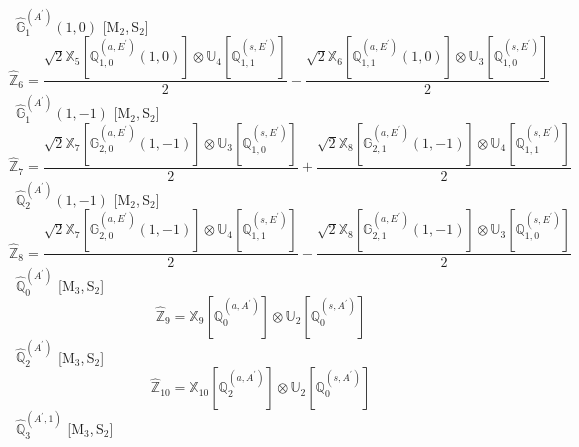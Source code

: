 \documentclass[fleqn,10pt,landscape]{article}
\begin{document}
\begin{itemize}
\begin{dmath*}
\end{dmath*}
\vspace{4mm}
\noindent {} $\,\,\,\hat{\mathbb{G}}_{1}^{(A^{\prime})}(1,0)$ [M$_{2}$,\,S$_{2}$]
\begin{dmath*}
\hat{\mathbb{Z}}_{6}=\frac{\sqrt{2} \mathbb{X}_{5}[\mathbb{Q}_{1,0}^{(a,E^{\prime})}(1,0)] \otimes\mathbb{U}_{4}[\mathbb{Q}_{1,1}^{(s,E^{\prime})}]}{2} - \frac{\sqrt{2} \mathbb{X}_{6}[\mathbb{Q}_{1,1}^{(a,E^{\prime})}(1,0)] \otimes\mathbb{U}_{3}[\mathbb{Q}_{1,0}^{(s,E^{\prime})}]}{2}
\end{dmath*}
\vspace{4mm}
\noindent {} $\,\,\,\hat{\mathbb{G}}_{1}^{(A^{\prime})}(1,-1)$ [M$_{2}$,\,S$_{2}$]
\begin{dmath*}
\hat{\mathbb{Z}}_{7}=\frac{\sqrt{2} \mathbb{X}_{7}[\mathbb{G}_{2,0}^{(a,E^{\prime})}(1,-1)] \otimes\mathbb{U}_{3}[\mathbb{Q}_{1,0}^{(s,E^{\prime})}]}{2} + \frac{\sqrt{2} \mathbb{X}_{8}[\mathbb{G}_{2,1}^{(a,E^{\prime})}(1,-1)] \otimes\mathbb{U}_{4}[\mathbb{Q}_{1,1}^{(s,E^{\prime})}]}{2}
\end{dmath*}
\vspace{4mm}
\noindent {} $\,\,\,\hat{\mathbb{Q}}_{2}^{(A^{\prime})}(1,-1)$ [M$_{2}$,\,S$_{2}$]
\begin{dmath*}
\hat{\mathbb{Z}}_{8}=\frac{\sqrt{2} \mathbb{X}_{7}[\mathbb{G}_{2,0}^{(a,E^{\prime})}(1,-1)] \otimes\mathbb{U}_{4}[\mathbb{Q}_{1,1}^{(s,E^{\prime})}]}{2} - \frac{\sqrt{2} \mathbb{X}_{8}[\mathbb{G}_{2,1}^{(a,E^{\prime})}(1,-1)] \otimes\mathbb{U}_{3}[\mathbb{Q}_{1,0}^{(s,E^{\prime})}]}{2}
\end{dmath*}
\vspace{4mm}
\noindent {} $\,\,\,\hat{\mathbb{Q}}_{0}^{(A^{\prime})}$ [M$_{3}$,\,S$_{2}$]
\begin{dmath*}
\hat{\mathbb{Z}}_{9}=\mathbb{X}_{9}[\mathbb{Q}_{0}^{(a,A^{\prime})}] \otimes\mathbb{U}_{2}[\mathbb{Q}_{0}^{(s,A^{\prime})}]
\end{dmath*}
\vspace{4mm}
\noindent {} $\,\,\,\hat{\mathbb{Q}}_{2}^{(A^{\prime})}$ [M$_{3}$,\,S$_{2}$]
\begin{dmath*}
\hat{\mathbb{Z}}_{10}=\mathbb{X}_{10}[\mathbb{Q}_{2}^{(a,A^{\prime})}] \otimes\mathbb{U}_{2}[\mathbb{Q}_{0}^{(s,A^{\prime})}]
\end{dmath*}
\vspace{4mm}
\noindent {} $\,\,\,\hat{\mathbb{Q}}_{3}^{(A^{\prime},1)}$ [M$_{3}$,\,S$_{2}$]
\begin{dmath*}

\end{dmath*}
\end{itemize}
\end{document}
